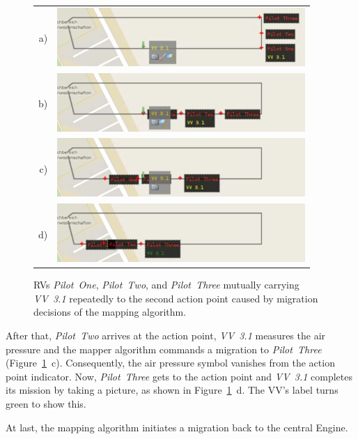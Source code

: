 \begin{figure}[h]
	\begin{center}
		\begin{tabular}{rr}
			a)&{\includegraphics[width=9.4cm]{ese-demo3-5.png}} \\
			b)&{\includegraphics[width=9.4cm]{ese-demo3-6.png}} \\
			c)&{\includegraphics[width=9.4cm]{ese-demo3-7.png}} \\
			d)&{\includegraphics[width=9.4cm]{ese-demo3-8.png}}
		\end{tabular}
	\end{center}
	\caption{\acp{RV} \textit{Pilot~One}, \textit{Pilot~Two}, and \textit{Pilot~Three} mutually carrying
		\textit{VV~3.1} repeatedly to the second action point caused by migration decisions of the mapping
		algorithm.\label{fig:demo3mig04}}
\end{figure}
After that, \textit{Pilot~Two}
arrives at the action point, \textit{VV~3.1} measures the air pressure and the mapper algorithm commands
a migration to \textit{Pilot~Three} (Figure~\ref{fig:demo3mig04}~c).
Consequently, the air pressure symbol vanishes from the action point indicator.
%
Now, \textit{Pilot~Three} gets to the action point and \textit{VV~3.1} completes its mission by 
taking a picture, as shown in Figure~\ref{fig:demo3mig04}~d. The \ac{VV}'s label turns green to show this.

At last, the mapping algorithm initiates a migration back to the central Engine.

